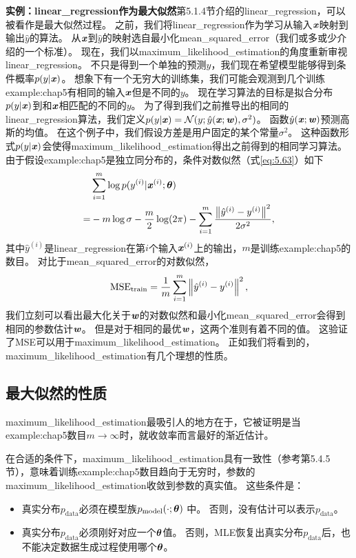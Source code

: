 \textbf{实例：\gls{linear_regression}作为最大似然}\quad 第5.1.4节介绍的\gls{linear_regression}，可以被看作是最大似然过程。
之前，我们将\gls{linear_regression}作为学习从输入$\boldsymbol{\mathit{x}}$映射到输出$\hat{y}$的算法。
从$\boldsymbol{\mathit{x}}$到$\hat{y}$的映射选自最小化\gls{mean_squared_error}（我们或多或少介绍的一个标准）。
现在，我们以\gls{maximum_likelihood_estimation}的角度重新审视\gls{linear_regression}。
不只是得到一个单独的预测$\hat{y}$，我们现在希望模型能够得到条件概率$p(y|\boldsymbol{\mathit{x}})$。
想象下有一个无穷大的训练集，我们可能会观测到几个训练\gls{example:chap5}有相同的输入$\boldsymbol{\mathit{x}}$但是不同的$y$。
现在学习算法的目标是拟合分布$p(y | \boldsymbol{\mathit{x}})$到和$\boldsymbol{\mathit{x}}$相匹配的不同的$y$。
为了得到我们之前推导出的相同的\gls{linear_regression}算法，我们定义$p(y | \boldsymbol{\mathit{x}}) = \mathcal{N}(y; \hat{y}(\boldsymbol{\mathit{x}}; \boldsymbol{\mathit{w}}), \sigma^2)$。
函数$\hat{y}(\boldsymbol{\mathit{x}}; \boldsymbol{\mathit{w}})$预测高斯的均值。
在这个例子中，我们假设方差是用户固定的某个常量$\sigma^2$。
这种函数形式$p(y|\boldsymbol{\mathit{x}})$会使得\gls{maximum_likelihood_estimation}得出之前得到的相同学习算法。
由于假设\gls{example:chap5}是独立同分布的，条件对数似然（式\ref{eq:5.63}）如下
\begin{align}
     & \sum_{i=1}^m \log p(y^{(i)} | \boldsymbol{\mathit{x}}^{(i)}; \boldsymbol{\theta}) \\
    =& -m \log\sigma - \frac{m}{2} \log(2\pi) - \sum_{i=1}^m \frac{ \left\lVert\hat{y}^{(i)} - y^{(i)} \right\rVert^2 }{2\sigma^2},
\end{align}
其中$\hat{y}^{(i)}$是\gls{linear_regression}在第$i$个输入$\boldsymbol{\mathit{x}}^{(i)}$上的输出，$m$是训练\gls{example:chap5}的数目。
对比于\gls{mean_squared_error}的对数似然，
\begin{equation}
    \text{MSE}_{\text{train}} = \frac{1}{m} \sum_{i=1}^m \left\lVert\hat{y}^{(i)} - y^{(i)}\right\rVert^2,
\end{equation}
我们立刻可以看出最大化关于$\boldsymbol{\mathit{w}}$的对数似然和最小化\gls{mean_squared_error}会得到相同的参数估计$\boldsymbol{\mathit{w}}$。
但是对于相同的最优$\boldsymbol{\mathit{w}}$，这两个准则有着不同的值。
这验证了MSE可以用于\gls{maximum_likelihood_estimation}。
正如我们将看到的，\gls{maximum_likelihood_estimation}有几个理想的性质。


\subsection{最大似然的性质}
\label{sec:properties_of_maximum_likelihood}
\gls{maximum_likelihood_estimation}最吸引人的地方在于，它被证明是当\gls{example:chap5}数目$m\to\infty$时，就收敛率而言最好的渐近估计。

在合适的条件下，\gls{maximum_likelihood_estimation}具有一致性（参考第5.4.5节），意味着训练\gls{example:chap5}数目趋向于无穷时，参数的\gls{maximum_likelihood_estimation}收敛到参数的真实值。
这些条件是：
\begin{itemize}
    \item 真实分布$p_{\text{data}}$必须在模型族$p_{\text{model}}(\cdot; \boldsymbol{\theta})$ 中。
    否则，没有估计可以表示$p_{\text{data}}$。
    
    \item 真实分布$p_{\text{data}}$必须刚好对应一个$\boldsymbol{\theta}$值。
    否则，\gls{MLE}恢复出真实分布$p_{\text{data}}$后，也不能决定数据生成过程使用哪个$\boldsymbol{\theta}$。
\end{itemize}

